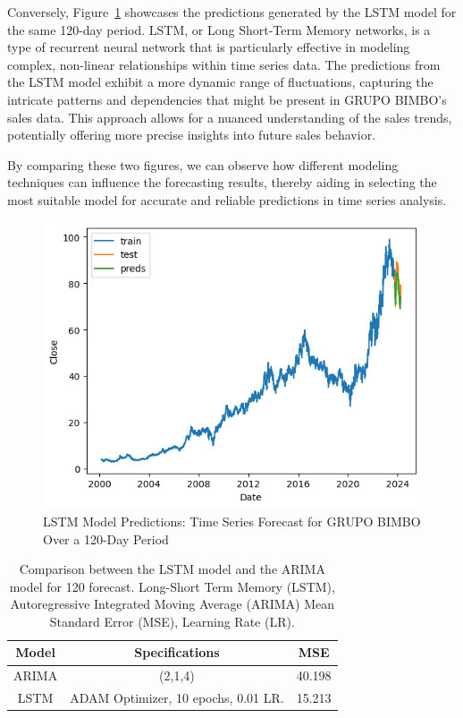 \documentclass[conference]{IEEEtran}
\begin{document}
Conversely, Figure~\ref{fig:bibmolstm} showcases the predictions generated by the LSTM model for the same 120-day period. LSTM, or Long Short-Term Memory networks, is a type of recurrent neural network that is particularly effective in modeling complex, non-linear relationships within time series data. The predictions from the LSTM model exhibit a more dynamic range of fluctuations, capturing the intricate patterns and dependencies that might be present in GRUPO BIMBO's sales data. This approach allows for a nuanced understanding of the sales trends, potentially offering more precise insights into future sales behavior.


By comparing these two figures, we can observe how different modeling techniques can influence the forecasting results, thereby aiding in selecting the most suitable model for accurate and reliable predictions in time series analysis.

\begin{figure}[htb]
    \centering
    \includegraphics[scale = 0.6]{LSTM.png}
    \caption{LSTM Model Predictions: Time Series Forecast for GRUPO BIMBO Over a 120-Day Period}
    \label{fig:bibmolstm}
\end{figure}


\begin{table}[h!]
    \centering
    \begin{tabular}{|c|c|c|}
        \hline
        \textbf{Model} & \textbf{Specifications} & \textbf{MSE}  \\
        \hline
        ARIMA & (2,1,4) & 40.198 \\
        LSTM & ADAM Optimizer, 10 epochs, 0.01 LR.& 15.213\\
         \hline
    \end{tabular}
    \caption{Comparison between the LSTM model and the ARIMA model for 120 forecast. Long-Short Term Memory (LSTM), Autoregressive Integrated Moving Average (ARIMA)  Mean Standard Error (MSE), Learning Rate (LR).}
    \label{tab:my_label}
\end{table}
\end{document}
